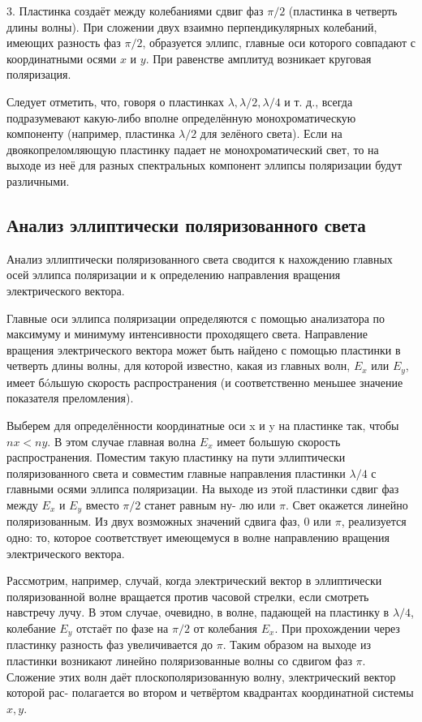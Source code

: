 \documentclass[a4paper,12pt]{article}
\begin{document}
3.  Пластинка создаёт между колебаниями сдвиг фаз $ \pi/2 $ (пластинка
в четверть длины волны). При сложении двух взаимно перпендикулярных колебаний, имеющих разность фаз $ \pi/2 $, образуется эллипс, главные оси которого совпадают с координатными осями $ x $ и $ y $. При равенстве амплитуд возникает круговая поляризация.
 	


Следует отметить, что, говоря о пластинках $ \lambda , \lambda/2, \lambda/4  $ и т. д., всегда подразумевают какую-либо вполне определённую монохроматическую
компоненту (например, пластинка $ \lambda/2 $ для зелёного света). Если на двоякопреломляющую пластинку падает не монохроматический свет, то на
выходе из неё для разных спектральных компонент эллипсы поляризации будут различными.

\subsection{Анализ эллиптически поляризованного света}

Анализ эллиптически поляризованного света сводится к нахождению главных осей
эллипса поляризации и к определению направления вращения электрического вектора.

Главные оси эллипса поляризации определяются с помощью анализатора по максимуму и минимуму интенсивности проходящего света.
Направление вращения электрического вектора может быть найдено
с помощью пластинки в четверть длины волны, для которой известно,
какая из главных волн, $ E_x $ или $ E_y $, имеет б\'{o}льшую скорость распространения (и соответственно меньшее значение показателя преломления).

Выберем для определённости координатные оси x и y на пластинке
так, чтобы $ nx < ny $. В этом случае главная волна $ E_x $ имеет большую
скорость распространения. Поместим такую пластинку на пути эллиптически поляризованного света и совместим главные направления пластинки $ \lambda/4 $ с главными осями эллипса поляризации. На выходе из этой
пластинки сдвиг фаз между $ E_x $ и $ E_y $ вместо $ \pi/2 $ станет равным ну-
лю или $ \pi $. Свет окажется линейно поляризованным. Из двух возможных значений сдвига фаз, 0 или $ \pi $, реализуется одно: то, которое соответствует имеющемуся в волне направлению вращения электрического вектора.

Рассмотрим, например, случай, когда электрический вектор в эллиптически поляризованной волне вращается против часовой стрелки,
если смотреть навстречу лучу. В этом случае, очевидно, в волне, падающей на пластинку в $ \lambda/4 $, колебание $ E_y $ отстаёт по фазе на $ \pi/2 $ от
колебания $ E_x $. При прохождении через пластинку разность фаз увеличивается до $ \pi $. Таким образом на выходе из пластинки возникают линейно поляризованные волны со сдвигом фаз $ \pi $. Сложение этих волн
даёт плоскополяризованную волну, электрический вектор которой рас-
полагается во втором и четвёртом квадрантах координатной системы
$ x, y $.
\end{document}
